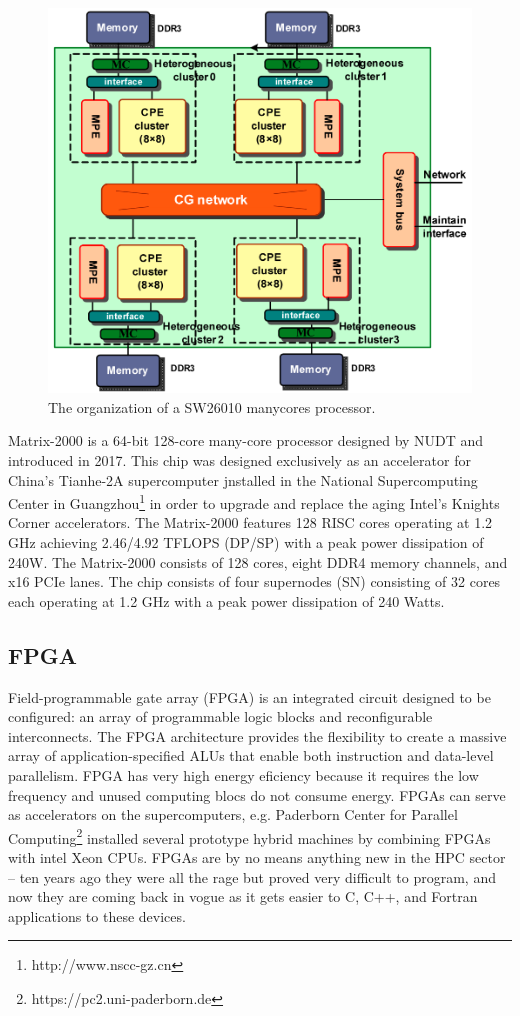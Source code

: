 \begin{figure}[t]
	\centering
	\includegraphics[width=5.6in]{fig/sw26010.png}
	\caption{The organization of a SW26010 manycores processor.}
	\label{fig:sw26010}
\end{figure}

Matrix-2000 \cite{matrix-2000} is a 64-bit 128-core many-core processor designed by NUDT and introduced in 2017. This chip was designed exclusively as an accelerator for China's Tianhe-2A supercomputer jnstalled in the National Supercomputing Center in Guangzhou\footnote{http://www.nscc-gz.cn} in order to upgrade and replace the aging Intel's Knights Corner accelerators. The Matrix-2000 features 128 RISC cores operating at 1.2 GHz achieving 2.46/4.92 TFLOPS (DP/SP) with a peak power dissipation of 240W. The Matrix-2000 consists of 128 cores, eight DDR4 memory channels, and x16 PCIe lanes. The chip consists of four supernodes (SN) consisting of 32 cores each operating at 1.2 GHz with a peak power dissipation of 240 Watts.

\subsection{FPGA}

Field-programmable gate array (FPGA) is an integrated circuit designed to be configured: an array of programmable logic blocks and reconfigurable interconnects. The FPGA architecture provides the flexibility to create a massive array of application-specified ALUs that enable both instruction and data-level parallelism. FPGA has very high energy eficiency because it requires the low frequency and unused computing blocs do not consume energy. FPGAs can serve as accelerators on the supercomputers, e.g. Paderborn Center for Parallel Computing\footnote{https://pc2.uni-paderborn.de} installed several prototype hybrid machines by combining FPGAs with intel Xeon CPUs. FPGAs are by no means anything new in the HPC sector – ten years ago they were all the rage but proved very difficult to program, and now they are coming back in vogue as it gets easier to C, C++, and Fortran applications to these devices.


